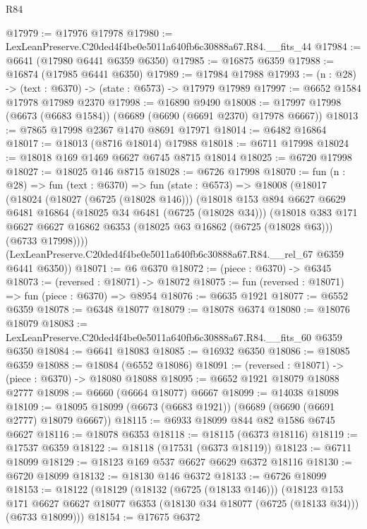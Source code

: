 \begin{lexlean}{R84}
\begin{coremodule}
@17979 := @17976 @17978
@17980 := LexLeanPreserve.C20ded4f4be0e5011a640fb6c30888a67.R84.__fits_44
@17984 := @6641 (@17980 @6441 @6359 @6350)
@17985 := @16875 @6359
@17988 := @16874 (@17985 @6441 @6350)
@17989 := @17984 @17988
@17993 := (n : @28) -> (text : @6370) -> (state : @6573) -> @17979 @17989
@17997 := @6652 @1584 @17978 @17989 @2370
@17998 := @16890 @9490
@18008 := @17997 @17998 (@6673 (@6683 @1584)) (@6689 (@6690 (@6691 @2370) @17978 @6667))
@18013 := @7865 @17998 @2367 @1470 @8691 @17971
@18014 := @6482 @16864
@18017 := @18013 (@8716 @18014) @17988
@18018 := @6711 @17998
@18024 := @18018 @169 @1469 @6627 @6745 @8715 @18014
@18025 := @6720 @17998
@18027 := @18025 @146 @8715
@18028 := @6726 @17998
@18070 := fun (n : @28) =>
  fun (text : @6370) =>
  fun (state : @6573) =>
  @18008
    (@18017
      (@18024
        (@18027 (@6725 (@18028 @146)))
        (@18018
          @153
          @894
          @6627
          @6629
          @6481
          @16864
          (@18025 @34 @6481 (@6725 (@18028 @34)))
          (@18018
            @383
            @171
            @6627
            @6627
            @16862
            @6353
            (@18025 @63 @16862 (@6725 (@18028 @63)))
            (@6733 @17998))))
      (LexLeanPreserve.C20ded4f4be0e5011a640fb6c30888a67.R84.__rel_67 @6359 @6441 @6350))
@18071 := @6 @6370
@18072 := (piece : @6370) -> @6345
@18073 := (reversed : @18071) -> @18072
@18075 := fun (reversed : @18071) => fun (piece : @6370) => @8954
@18076 := @6635 @1921
@18077 := @6552 @6359
@18078 := @6348 @18077
@18079 := @18078 @6374
@18080 := @18076 @18079
@18083 := LexLeanPreserve.C20ded4f4be0e5011a640fb6c30888a67.R84.__fits_60 @6359 @6350
@18084 := @6641 @18083
@18085 := @16932 @6350
@18086 := @18085 @6359
@18088 := @18084 (@6552 @18086)
@18091 := (reversed : @18071) -> (piece : @6370) -> @18080 @18088
@18095 := @6652 @1921 @18079 @18088 @2777
@18098 := @6660 (@6664 @18077) @6667
@18099 := @14038 @18098
@18109 := @18095 @18099 (@6673 (@6683 @1921)) (@6689 (@6690 (@6691 @2777) @18079 @6667))
@18115 := @6933 @18099 @844 @82 @1586 @6745 @6627
@18116 := @18078 @6353
@18118 := @18115 (@6373 @18116)
@18119 := @17537 @6359
@18122 := @18118 (@17531 (@6373 @18119))
@18123 := @6711 @18099
@18129 := @18123 @169 @537 @6627 @6629 @6372 @18116
@18130 := @6720 @18099
@18132 := @18130 @146 @6372
@18133 := @6726 @18099
@18153 := @18122
    (@18129
      (@18132 (@6725 (@18133 @146)))
      (@18123
        @153
        @171
        @6627
        @6627
        @18077
        @6353
        (@18130 @34 @18077 (@6725 (@18133 @34)))
        (@6733 @18099)))
@18154 := @17675 @6372

\end{coremodule}
\end{lexlean}
